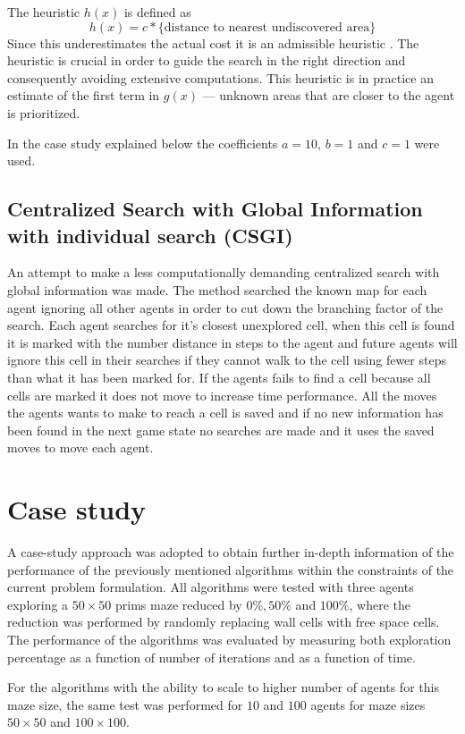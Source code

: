 \documentclass{article}
\begin{document}
The heuristic $h(x)$ is defined as 
%
$$h(x) = c * \text{\{distance to nearest undiscovered area\} }$$
%
Since this underestimates the actual cost it is an admissible heuristic 
\cite{russell2003artificial}. The heuristic is crucial in order to guide the 
search in the right direction and consequently avoiding extensive computations.
This heuristic is in practice an estimate of the first term in $g(x)$ ---
unknown areas that are closer to the agent is prioritized.

In the case study explained below the coefficients $a = 10$, $b = 1$ and $c =
1$ were used.

\subsection{Centralized Search with Global Information with individual search (CSGI)}
An attempt to make a less computationally demanding centralized search with global information was made.
The method searched the known map for each agent ignoring all other agents in order to cut down the branching factor of the search. Each agent searches for it's closest unexplored cell, when this cell is found it is marked with the number distance in steps to the agent and future agents will ignore this cell in their searches if they cannot walk to the cell using fewer steps than what it has been marked for. If the agents fails to find a cell because all cells are marked it does not move to increase time performance. All the moves the agents wants to make to reach a cell is saved and if no new information has been found in the next game state no searches are made and it uses the saved moves to move each agent.

\section{Case study}
A case-study approach was adopted to obtain further in-depth information of the
performance of the previously mentioned algorithms within the constraints of
the current problem formulation. All algorithms were tested with three agents
exploring a $50 \times 50$ prims maze reduced by $0 \%, 50 \% $ and $100\%$, where the
reduction was performed by randomly replacing wall cells with free space cells.
The performance of the algorithms was evaluated by measuring both exploration
percentage as a function of number of iterations and as a function of time.


For the algorithms with the ability to scale to higher number of agents for this
maze size, the same test was performed for $10$ and $100$ agents for maze sizes
$50 \times 50$ and $100 \times 100$. 
\end{document}
